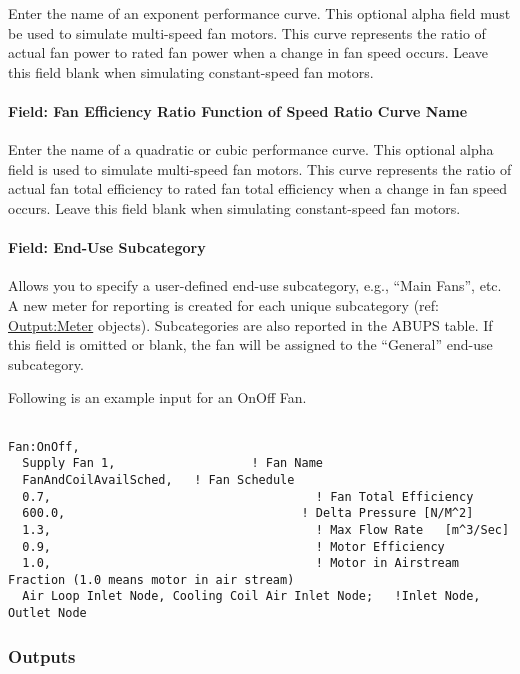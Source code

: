Enter the name of an exponent performance curve. This optional alpha field must be used to simulate multi-speed fan motors. This curve represents the ratio of actual fan power to rated fan power when a change in fan speed occurs. Leave this field blank when simulating constant-speed fan motors.

\paragraph{Field: Fan Efficiency Ratio Function of Speed Ratio Curve Name}\label{field-fan-efficiency-ratio-function-of-speed-ratio-curve-name}

Enter the name of a quadratic or cubic performance curve. This optional alpha field is used to simulate multi-speed fan motors. This curve represents the ratio of actual fan total efficiency to rated fan total efficiency when a change in fan speed occurs. Leave this field blank when simulating constant-speed fan motors.

\paragraph{Field: End-Use Subcategory}

Allows you to specify a user-defined end-use subcategory, e.g., ``Main Fans'', etc. A new meter for reporting is created for each unique subcategory (ref: \hyperref[outputmeter-and-outputmetermeterfileonly]{Output:Meter} objects). Subcategories are also reported in the ABUPS table. If this field is omitted or blank, the fan will be assigned to the ``General'' end-use subcategory.

Following is an example input for an OnOff Fan.

\begin{lstlisting}

Fan:OnOff,
  Supply Fan 1,                   ! Fan Name
  FanAndCoilAvailSched,   ! Fan Schedule
  0.7,                                     ! Fan Total Efficiency
  600.0,                                 ! Delta Pressure [N/M^2]
  1.3,                                     ! Max Flow Rate   [m^3/Sec]
  0.9,                                     ! Motor Efficiency
  1.0,                                     ! Motor in Airstream Fraction (1.0 means motor in air stream)
  Air Loop Inlet Node, Cooling Coil Air Inlet Node;   !Inlet Node, Outlet Node
\end{lstlisting}

\subsubsection{Outputs}\label{outputs-1-011}

